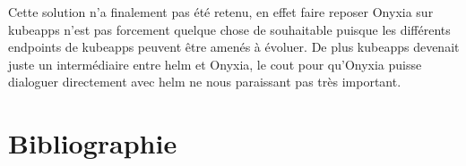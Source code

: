 \documentclass[11pt,fleqn]{book} %
\begin{document}
Cette solution n'a finalement pas été retenu, en effet faire reposer Onyxia sur kubeapps n'est pas forcement quelque chose de souhaitable puisque les différents endpoints de kubeapps peuvent être amenés à évoluer. De plus kubeapps devenait juste un intermédiaire entre helm et Onyxia, le cout pour qu'Onyxia  puisse dialoguer directement avec helm ne nous paraissant pas très important.




\chapter*{Bibliographie}
\nocite{*}
\vspace{-2cm}
\printbibliography[heading=bibempty]




\cleardoublepage
{}
\setlength{\columnsep}{0.75cm}
\printindex

\end{document}
